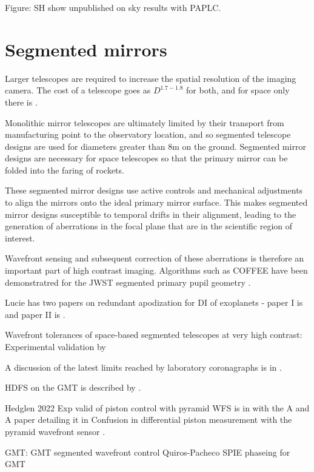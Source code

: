 \documentclass[letterpaper]{ar-1col}
\begin{document}
Figure: SH show unpublished on sky results with PAPLC.

\section{Segmented mirrors}

Larger telescopes are required to increase the spatial resolution of the imaging camera. The cost of a telescope goes as $D^{1.7-1.8}$ \citep{Stahl20} for both, and for space only there is \citet{Stahl10}.
 
Monolithic mirror telescopes are ultimately limited by their transport from manufacturing point to the observatory location, and so segmented telescope designs are used for diameters greater than 8m on the ground.
 Segmented mirror designs are necessary for space telescopes so that the primary mirror can be folded into the faring of rockets.

These segmented mirror designs use active controls and mechanical adjustments to align the mirrors onto the ideal primary mirror surface.
%
This makes segmented mirror designs susceptible to temporal drifts in their alignment, leading to the generation of aberrations in the focal plane that are in the scientific region of interest.

Wavefront sensing and subsequent correction of these aberrations is therefore an important part of high contrast imaging.
%
Algorithms such as COFFEE have been demonstratred for the JWST segmented primary pupil geometry \citep{Leboulleux20}.

Lucie has two papers on redundant apodization for DI of exoplanets - paper I is \citep{Leboulleux22} and paper II is \citet{Leboulleux22a}.

Wavefront tolerances of space-based segmented telescopes at very high contrast: Experimental validation by \citet{Laginja22}

A discussion of the latest limits reached by laboratory coronagraphs is in \citet{Mennesson24}.



HDFS on the GMT is described by \citet{Haffert22}.

Hedglen 2022 Exp valid of piston control with pyramid WFS is in \citet{Bertrou-Cantou23} with the A and A paper detailing it in Confusion in differential piston measurement with the pyramid wavefront sensor \citep{Bertrou-Cantou22}.

GMT: GMT segmented wavefront control Quiros-Pacheco SPIE phaseing for GMT \citep{Quiros-Pacheco22}
\end{document}
